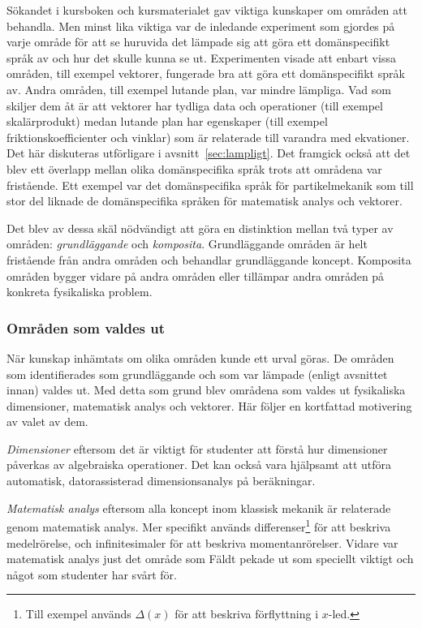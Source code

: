 Sökandet i kursboken och kursmaterialet gav viktiga kunskaper om områden att
behandla. Men minst lika viktiga var de inledande experiment som gjordes på
varje område för att se huruvida det lämpade sig att göra ett domänspecifikt
språk av och hur det skulle kunna se ut. Experimenten visade att enbart vissa
områden, till exempel vektorer, fungerade bra att göra ett domänspecifikt språk
av. Andra områden, till exempel lutande plan, var mindre lämpliga. Vad som skiljer dem åt är att vektorer har tydliga data och operationer (till exempel skalärprodukt) medan lutande plan har egenskaper (till exempel friktionskoefficienter och vinklar) som är relaterade till varandra med ekvationer. Det här diskuteras utförligare i avsnitt~\ref{sec:lampligt}. Det framgick också att det
blev ett överlapp mellan olika domänspecifika språk trots att områdena var fristående.
Ett exempel var det domänspecifika språk för partikelmekanik som till stor del
liknade de domänspecifika språken för matematisk analys och vektorer.

Det blev av dessa skäl nödvändigt att göra en distinktion mellan två typer av
områden: \textit{grundläggande} och \textit{komposita}. Grundläggande områden är
helt fristående från andra områden och behandlar grundläggande koncept.
Komposita områden bygger vidare på andra områden eller tillämpar andra områden
på konkreta fysikaliska problem.

\subsubsection*{Områden som valdes ut}

När kunskap inhämtats om olika områden kunde ett urval göras. De områden som
identifierades som grundläggande och som var lämpade (enligt avsnittet innan) valdes ut. Med detta som grund blev områdena som valdes ut fysikaliska dimensioner, matematisk analys och vektorer. Här följer en kortfattad motivering av valet av dem.

\textit{Dimensioner} eftersom det är viktigt för studenter att förstå
hur dimensioner påverkas av algebraiska operationer. Det kan också vara
hjälpsamt att utföra automatisk, datorassisterad dimensionsanalys på
beräkningar.

\textit{Matematisk analys} eftersom alla koncept inom klassisk mekanik är
relaterade genom matematisk analys. Mer specifikt används
differenser\footnote{Till exempel används $\Delta(x)$ för att beskriva
förflyttning i $x$-led.} för att beskriva medelrörelse, och infinitesimaler
för att beskriva momentanrörelser. Vidare var matematisk analys just det
område som Fäldt pekade ut som speciellt viktigt och något som studenter har
svårt för.


